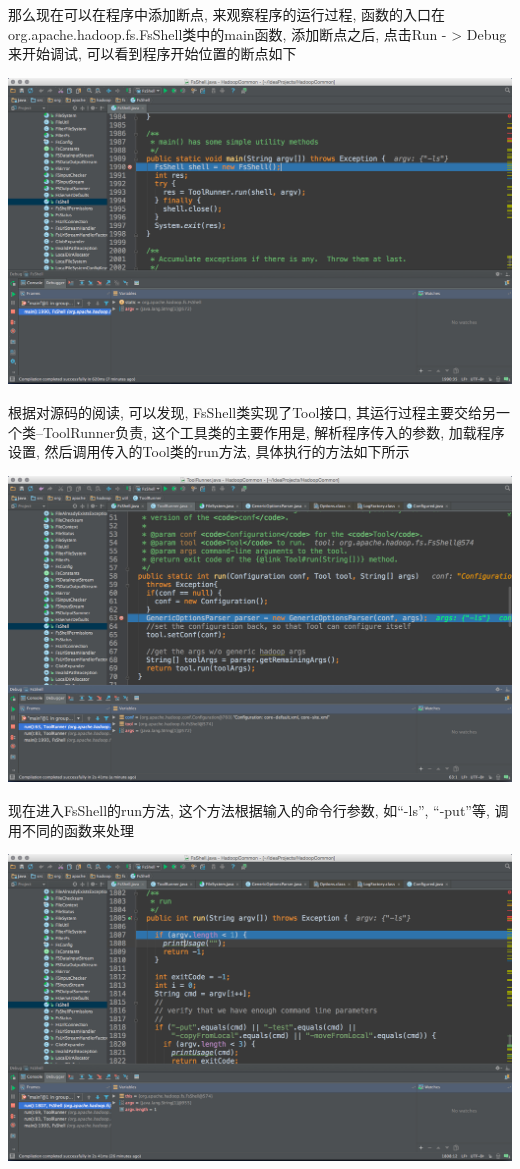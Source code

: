 那么现在可以在程序中添加断点, 来观察程序的运行过程,
函数的入口在org.apache.hadoop.fs.FsShell类中的main函数, 添加断点之后,
点击Run - > Debug来开始调试, 可以看到程序开始位置的断点如下

\includegraphics[width=\textwidth]{image/env/cr33.png}

根据对源码的阅读, 可以发现, FsShell类实现了Tool接口,
其运行过程主要交给另一个类--ToolRunner负责, 这个工具类的主要作用是,
解析程序传入的参数, 加载程序设置, 然后调用传入的Tool类的run方法, 具体执行的方法如下所示

\includegraphics[width=\textwidth]{image/env/cr34.png}

现在进入FsShell的run方法, 这个方法根据输入的命令行参数,
如``-ls'', ``-put''等, 调用不同的函数来处理

\includegraphics[width=\textwidth]{image/env/cr35.png}

